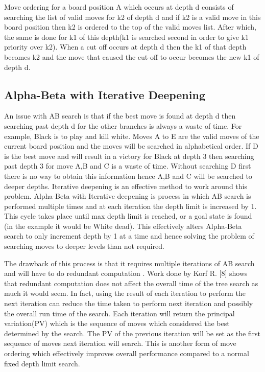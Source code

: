 \documentclass{l4proj}
\begin{document}
Move ordering for a board position A which occurs at depth d consists of searching the list of valid moves for k2 of depth d and if k2 is a valid move in this board position then k2 is ordered to the top of the valid moves list. After which, the same is done for k1 of this depth(k1 is searched second in order to give k1 priority over k2). When a cut off occurs at depth d then the k1 of that depth becomes k2 and the move that caused the cut-off to occur becomes the new k1 of depth d.

\subsection{Alpha-Beta with Iterative Deepening}
An issue with AB search is that if the best move is found at depth d then searching past depth d for the other branches is always a waste of time. For example,  Black is to play and kill white. Moves A to E are the valid moves of the current board position and the moves will be searched in alphabetical order. If D is the best move and will result in a victory for Black at depth 3 then searching past depth 3 for move A,B and C is a waste of time. Without searching D first there is no way to obtain this information hence A,B and C will be searched to deeper depths. Iterative deepening is an effective method to work around this problem. Alpha-Beta with Iterative deepening is process in which AB search is performed multiple times and at each iteration the depth limit is increased by 1. This cycle takes place until max depth limit is reached, or a goal state is found  (in the example it would be White dead). This effectively alters Alpha-Beta search to only increment depth by 1 at a time and hence solving the problem of searching moves to deeper levels than not required.

The drawback of this process is that it requires multiple iterations of AB search and will have to do redundant computation . Work done by Korf R. [8] shows that redundant computation does not affect the overall time of the tree search as much it would seem. In fact, using the result of each iteration to perform the next iteration can reduce the time taken to perform next iteration and possibly the overall run time of the search. Each iteration will return the principal variation(PV) which is the sequence of moves which considered the best determined by the search. The PV of the previous iteration will be set as the first sequence of moves next iteration will search. This is another form of move ordering which effectively improves overall performance compared to a normal fixed depth limit search.
\end{document}
